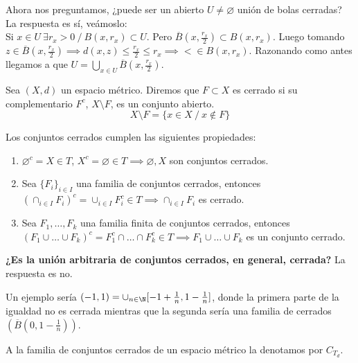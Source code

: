 Ahora nos preguntamos, ¿puede ser un abierto $U \neq \varnothing $ unión de bolas cerradas? La respuesta es sí,  veámoslo: \\

Si $x \in U \ \exists r_x>0\ /\ B(x,r_x) \subset U$. Pero $\overline{B}(x, \frac{r_x}{2}) \subset B(x,r_x)$. Luego tomando $z \in \overline{B}(x,\frac{r_x}{2}) \implies d(x,z) \le \frac{r_x}{2} \le r_x \implies < \in B(x,r_x)$. Razonando como antes llegamos a que $U = \bigcup_{x \in U} \overline{B}(x,\frac{r_x}{2})$.

\begin{ndef}[Cerrado]
  Sea $(X,d)$ un espacio métrico. Diremos que $F \subset X$ es cerrado si su complementario $F^c$, $X \setminus F$, es un conjunto abierto. \[ X\setminus F = \{x \in X\ /\ x \notin F\}\]
\end{ndef}
\begin{properties}
 Los conjuntos cerrados cumplen las siguientes propiedades:
    \begin{enumerate}
    \item $\varnothing ^c=X \in T$, $X^c=\varnothing \in T\implies \varnothing ,X$ son conjuntos cerrados.
    \item Sea $\{F_i\}_{i \in I}$ una familia de conjuntos cerrados, entonces $(\cap_{i \in I}F_i)^c = \cup_{i \in I}F_i^c \in T \implies \cap_{i \in I}F_i$ es cerrado.
    \item Sea $F_1,\ldots,F_k$ una familia finita de conjuntos cerrados, entonces $(F_1 \cup \ldots \cup F_k)^c=F_1^c \cap \ldots \cap F_k^c \in T \implies F_1 \cup \ldots \cup F_k$ es un conjunto cerrado.
    \end{enumerate}
\end{properties}
  \textbf{¿Es la unión arbitraria de conjuntos cerrados, en general, cerrada?} La respuesta es no.
  \begin{exmp}
    Un ejemplo sería $(-1,1)=\cup_{n \in \N}[-1+\frac{1}{n},1-\frac{1}{n}]$, donde la primera parte de la igualdad no es cerrada mientras que la segunda sería una familia de cerrados $(\overline{B}(0,1-\frac{1}{n}))$.
  \end{exmp}
  \begin{ndef}
      A la familia de conjuntos cerrados de un espacio métrico la denotamos por $C_{T_d}$.
  \end{ndef}

